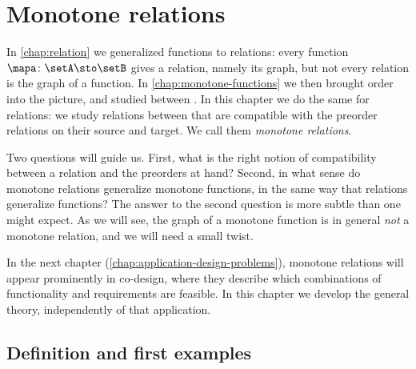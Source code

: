 

\section{Monotone relations}
\label{sec:monotone-relations}

In \cref{chap:relation} we generalized functions to relations: every function $\mapa \colon \setA \sto \setB$ gives a relation, namely its graph, but not every relation is the graph of a function.
In \cref{chap:monotone-functions} we then brought order into the picture, and studied  between .
In this chapter we do the same for relations: we study relations between  that are compatible with the preorder relations on their source and target.
We call them \emph{monotone relations}.

Two questions will guide us.
First, what is the right notion of compatibility between a relation and the preorders at hand?
Second, in what sense do monotone relations generalize monotone functions, in the same way that relations generalize functions?
The answer to the second question is more subtle than one might expect.
As we will see, the graph of a monotone function is in general \emph{not} a monotone relation, and we will need a small twist.

\begin{remark}
    In the next chapter (\cref{chap:application-design-problems}), monotone relations will appear prominently in co-design, where they describe which combinations of functionality and requirements are feasible.
    In this chapter we develop the general theory, independently of that application.
\end{remark}

\subsection{Definition and first examples}

